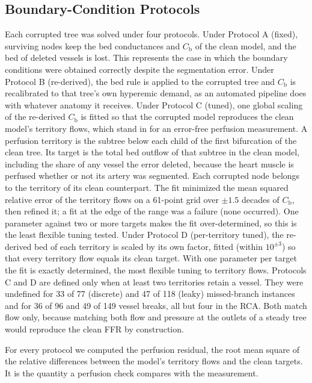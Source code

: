 \documentclass[journal,twoside,web]{ieeecolor}
\begin{document}
\subsection{Boundary-Condition Protocols}
Each corrupted tree was solved under four protocols. Under Protocol A (fixed), surviving
nodes keep the bed conductances and $C_\mathrm{b}$ of the clean model, and the bed of deleted vessels is lost. This represents
the case in which the boundary conditions were obtained correctly despite the segmentation error. Under Protocol B
(re-derived), the bed rule is applied to the corrupted tree and $C_\mathrm{b}$ is recalibrated to that tree's own hyperemic
demand, as an automated pipeline does with whatever anatomy it receives. Under Protocol C (tuned), one global
scaling of the re-derived $C_\mathrm{b}$ is fitted so that the corrupted model reproduces the clean model's territory
flows, which stand in for an error-free perfusion measurement. A perfusion territory is the subtree below each child of
the first bifurcation of the clean tree. Its target is the total bed outflow of that subtree in the clean model,
including the share of any vessel the error deleted, because the heart muscle is perfused whether or not its artery
was segmented. Each corrupted node belongs to the territory of its clean counterpart. The fit minimized the mean squared relative error of the territory flows on a 61-point grid over $\pm 1.5$ decades
of $C_\mathrm{b}$, then refined it; a fit at the edge of the range was a failure (none occurred).
One parameter against two or more targets makes the fit over-determined, so this is the least flexible tuning tested. Under Protocol D (per-territory tuned), the re-derived bed of each territory is scaled by its
own factor, fitted (within $10^{\pm 3}$) so that every territory flow equals its clean target. With one parameter per target the fit is
exactly determined, the most flexible tuning to territory flows. Protocols C and D are defined only when at least two territories retain a vessel. They were undefined for 33 of
77 (discrete) and 47 of 118 (leaky) missed-branch instances and for 36 of 96 and 49 of 149 vessel breaks, all but
four in the RCA. Both match
flow only, because matching both flow and pressure at the outlets of a steady tree would reproduce the clean FFR by
construction.

For every protocol we computed the perfusion residual, the root mean square of the relative differences between the
model's territory flows and the clean targets. It is the quantity a perfusion check compares with the measurement.
\end{document}
